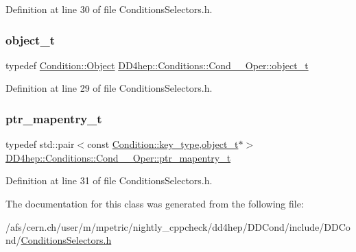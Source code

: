 Definition at line 30 of file Conditions\+Selectors.\+h.

\hypertarget{class_d_d4hep_1_1_conditions_1_1_cond_____oper_a4229491e49bfd21058dff10125a73f63}{}\label{class_d_d4hep_1_1_conditions_1_1_cond_____oper_a4229491e49bfd21058dff10125a73f63} 
\subsubsection{\texorpdfstring{object\+\_\+t}{object\_t}}
{\footnotesize\ttfamily typedef \hyperlink{class_d_d4hep_1_1_conditions_1_1_condition_a6fc8dae0dad41db6a237920c85f8a55d}{Condition\+::\+Object} \hyperlink{class_d_d4hep_1_1_conditions_1_1_cond_____oper_a4229491e49bfd21058dff10125a73f63}{D\+D4hep\+::\+Conditions\+::\+Cond\+\_\+\+\_\+\+Oper\+::object\+\_\+t}}



Definition at line 29 of file Conditions\+Selectors.\+h.

\hypertarget{class_d_d4hep_1_1_conditions_1_1_cond_____oper_a0949e4bd5f90cd3fae2394cf30983973}{}\label{class_d_d4hep_1_1_conditions_1_1_cond_____oper_a0949e4bd5f90cd3fae2394cf30983973} 
\subsubsection{\texorpdfstring{ptr\+\_\+mapentry\+\_\+t}{ptr\_mapentry\_t}}
{\footnotesize\ttfamily typedef std\+::pair$<$const \hyperlink{class_d_d4hep_1_1_conditions_1_1_condition_a7528efa762e8cc072ef80ea67c3531f9}{Condition\+::key\+\_\+type},\hyperlink{class_d_d4hep_1_1_conditions_1_1_cond_____oper_a4229491e49bfd21058dff10125a73f63}{object\+\_\+t}$\ast$$>$ \hyperlink{class_d_d4hep_1_1_conditions_1_1_cond_____oper_a0949e4bd5f90cd3fae2394cf30983973}{D\+D4hep\+::\+Conditions\+::\+Cond\+\_\+\+\_\+\+Oper\+::ptr\+\_\+mapentry\+\_\+t}}



Definition at line 31 of file Conditions\+Selectors.\+h.



The documentation for this class was generated from the following file\+:\begin{DoxyCompactItemize}
\item 
/afs/cern.\+ch/user/m/mpetric/nightly\+\_\+cppcheck/dd4hep/\+D\+D\+Cond/include/\+D\+D\+Cond/\hyperlink{_conditions_selectors_8h}{Conditions\+Selectors.\+h}\end{DoxyCompactItemize}
